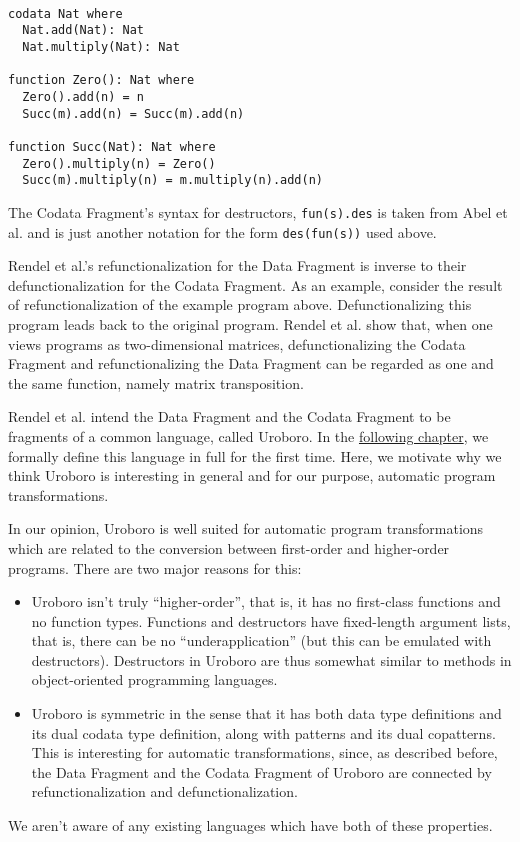 \begin{lstlisting}

codata Nat where
  Nat.add(Nat): Nat
  Nat.multiply(Nat): Nat

function Zero(): Nat where
  Zero().add(n) = n
  Succ(m).add(n) = Succ(m).add(n)

function Succ(Nat): Nat where
  Zero().multiply(n) = Zero()
  Succ(m).multiply(n) = m.multiply(n).add(n)

\end{lstlisting}
The Codata Fragment's syntax for destructors, \texttt{fun(s).des} is taken from Abel et al.\cite{abel13copatterns} and is just another notation for the form \texttt{des(fun(s))} used above.

Rendel et al.'s\cite{rendel15automatic} refunctionalization for the Data Fragment is inverse to their defunctionalization for the Codata Fragment. As an example, consider the result of refunctionalization of the example program above. Defunctionalizing this program leads back to the original program. Rendel et al. show that, when one views programs as two-dimensional matrices, defunctionalizing the Codata Fragment and refunctionalizing the Data Fragment can be regarded as one and the same function, namely matrix transposition.

Rendel et al. intend the Data Fragment and the Codata Fragment to be fragments of a common language, called Uroboro. In the \hyperref[ch:uro]{following chapter}, we formally define this language in full for the first time. Here, we motivate why we think Uroboro is interesting in general and for our purpose, automatic program transformations.

In our opinion, Uroboro is well suited for automatic program transformations which are related to the conversion between first-order and higher-order programs. There are two major reasons for this:
\begin{itemize}
\item Uroboro isn't truly ``higher-order'', that is, it has no first-class functions and no function types. Functions and destructors have fixed-length argument lists, that is, there can be no ``underapplication'' (but this can be emulated with destructors). Destructors in Uroboro are thus somewhat similar to methods in object-oriented programming languages.

\item Uroboro is symmetric in the sense that it has both data type definitions and its dual codata type definition, along with patterns and its dual copatterns. This is interesting for automatic transformations, since, as described before, the Data Fragment and the Codata Fragment of Uroboro are connected by refunctionalization and defunctionalization.
\end{itemize}
We aren't aware of any existing languages which have both of these properties.

